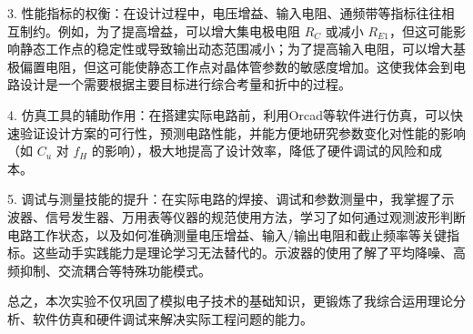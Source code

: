 \documentclass[12pt,a4paper]{article}
\begin{document}
3.  性能指标的权衡：在设计过程中，电压增益、输入电阻、通频带等指标往往相互制约。例如，为了提高增益，可以增大集电极电阻 $R_C$ 或减小 $R_{E1}$，但这可能影响静态工作点的稳定性或导致输出动态范围减小；为了提高输入电阻，可以增大基极偏置电阻，但这可能使静态工作点对晶体管参数的敏感度增加。这使我体会到电路设计是一个需要根据主要目标进行综合考量和折中的过程。

4.  仿真工具的辅助作用：在搭建实际电路前，利用Orcad等软件进行仿真，可以快速验证设计方案的可行性，预测电路性能，并能方便地研究参数变化对性能的影响（如 $C_u$ 对 $f_H$ 的影响），极大地提高了设计效率，降低了硬件调试的风险和成本。

5.  调试与测量技能的提升：在实际电路的焊接、调试和参数测量中，我掌握了示波器、信号发生器、万用表等仪器的规范使用方法，学习了如何通过观测波形判断电路工作状态，以及如何准确测量电压增益、输入/输出电阻和截止频率等关键指标。这些动手实践能力是理论学习无法替代的。示波器的使用了解了平均降噪、高频抑制、交流耦合等特殊功能模式。

总之，本次实验不仅巩固了模拟电子技术的基础知识，更锻炼了我综合运用理论分析、软件仿真和硬件调试来解决实际工程问题的能力。
\end{document}
